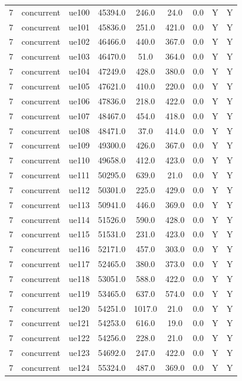 \begin{table}[ht]
\begin{tabular}{|c|c|c|c|c|c|c|c|c|}
7 & concurrent & ue100 & 45394.0 & 246.0 & 24.0 & 0.0 & Y & Y \\
7 & concurrent & ue101 & 45836.0 & 251.0 & 421.0 & 0.0 & Y & Y \\
7 & concurrent & ue102 & 46466.0 & 440.0 & 367.0 & 0.0 & Y & Y \\
7 & concurrent & ue103 & 46470.0 & 51.0 & 364.0 & 0.0 & Y & Y \\
7 & concurrent & ue104 & 47249.0 & 428.0 & 380.0 & 0.0 & Y & Y \\
7 & concurrent & ue105 & 47621.0 & 410.0 & 220.0 & 0.0 & Y & Y \\
7 & concurrent & ue106 & 47836.0 & 218.0 & 422.0 & 0.0 & Y & Y \\
7 & concurrent & ue107 & 48467.0 & 454.0 & 418.0 & 0.0 & Y & Y \\
7 & concurrent & ue108 & 48471.0 & 37.0 & 414.0 & 0.0 & Y & Y \\
7 & concurrent & ue109 & 49300.0 & 426.0 & 367.0 & 0.0 & Y & Y \\
7 & concurrent & ue110 & 49658.0 & 412.0 & 423.0 & 0.0 & Y & Y \\
7 & concurrent & ue111 & 50295.0 & 639.0 & 21.0 & 0.0 & Y & Y \\
7 & concurrent & ue112 & 50301.0 & 225.0 & 429.0 & 0.0 & Y & Y \\
7 & concurrent & ue113 & 50941.0 & 446.0 & 369.0 & 0.0 & Y & Y \\
7 & concurrent & ue114 & 51526.0 & 590.0 & 428.0 & 0.0 & Y & Y \\
7 & concurrent & ue115 & 51531.0 & 231.0 & 423.0 & 0.0 & Y & Y \\
7 & concurrent & ue116 & 52171.0 & 457.0 & 303.0 & 0.0 & Y & Y \\
7 & concurrent & ue117 & 52465.0 & 380.0 & 373.0 & 0.0 & Y & Y \\
7 & concurrent & ue118 & 53051.0 & 588.0 & 422.0 & 0.0 & Y & Y \\
7 & concurrent & ue119 & 53465.0 & 637.0 & 574.0 & 0.0 & Y & Y \\
7 & concurrent & ue120 & 54251.0 & 1017.0 & 21.0 & 0.0 & Y & Y \\
7 & concurrent & ue121 & 54253.0 & 616.0 & 19.0 & 0.0 & Y & Y \\
7 & concurrent & ue122 & 54256.0 & 228.0 & 21.0 & 0.0 & Y & Y \\
7 & concurrent & ue123 & 54692.0 & 247.0 & 422.0 & 0.0 & Y & Y \\
7 & concurrent & ue124 & 55324.0 & 487.0 & 369.0 & 0.0 & Y & Y \\

\end{tabular}
\end{table}
